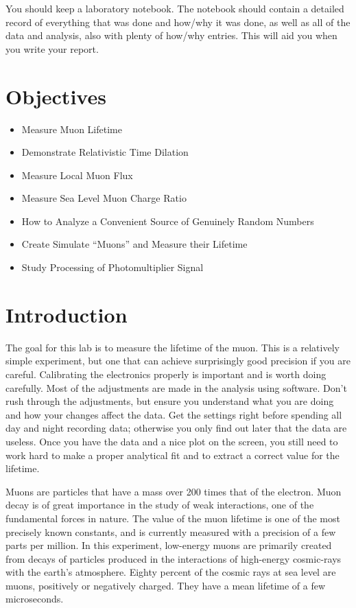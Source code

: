 \documentclass{../lab}
\begin{document}
You should keep a laboratory notebook. The notebook should contain a detailed record of everything that was done and how/why it was done, as well as all of the data and analysis, also with plenty of how/why entries. This will aid you when you write your report.

\section{Objectives}

\begin{itemize}
    \item Measure Muon Lifetime

    \item Demonstrate Relativistic Time Dilation

    \item Measure Local Muon Flux

    \item Measure Sea Level Muon Charge Ratio

    \item How to Analyze a Convenient Source of Genuinely Random Numbers

    \item Create Simulate ``Muons'' and Measure their Lifetime

    \item Study Processing of Photomultiplier Signal

\end{itemize}

\section{Introduction}

The goal for this lab is to measure the lifetime of the muon. This is a relatively simple experiment, but one that can achieve surprisingly good precision if you are careful. Calibrating the electronics properly is important and is worth doing carefully. Most of the adjustments are made in the analysis using software. Don't rush through the adjustments, but ensure you understand what you are doing and how your changes affect the data. Get the settings right before spending all day and night recording data; otherwise you only find out later that the data are useless. Once you have the data and a nice plot on the screen, you still need to work hard to make a proper analytical fit and to extract a correct value for the lifetime.

Muons are particles that have a mass over 200 times that of the electron. Muon decay is of great importance in the study of weak interactions, one of the fundamental forces in nature. The value of the muon lifetime is one of the most precisely known constants, and is currently measured with a precision of a few parts per million. In this experiment, low-energy muons are primarily created from decays of particles produced in the interactions of high-energy cosmic-rays with the earth's atmosphere. Eighty percent of the cosmic rays at sea level are muons, positively or negatively charged. They have a mean lifetime of a few microseconds.
\end{document}
